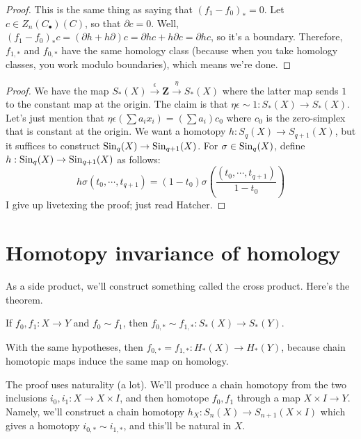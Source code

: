 		\begin{proof}
		This is the same thing as saying that $(f_1-f_0)_\ast=0$. Let $c\in Z_n(C_\bullet)(C)$, so that $\partial c=0$. Well, $(f_1-f_0)_\ast c=(\partial h+h\partial)c=\partial hc+h\partial c=\partial hc$, so it's a boundary. Therefore, $f_{1,\ast}$ and $f_{0,\ast}$ have the same homology class (because when you take homology classes, you work modulo boundaries), which means we're done.
		\end{proof}
		\begin{proof}
		We have the map $S_\ast(X)\xrightarrow{\epsilon}\mathbf{Z}\xrightarrow{\eta}S_\ast(X)$ where the latter map sends $1$ to the constant map at the origin. The claim is that $\eta\epsilon\sim 1:S_\ast(X)\to S_\ast(X)$. Let's just mention that $\eta\epsilon(\sum a_ix_i)=(\sum a_i)c_0$ where $c_0$ is the zero-simplex that is constant at the origin. We want a homotopy $h:S_q(X)\to S_{q+1}(X)$, but it suffices to construct $\mathrm{Sin}_q(X)\to \mathrm{Sin}_{q+1}(X)$. For $\sigma\in\mathrm{Sin}_q(X)$, define $h:\mathrm{Sin}_q(X)\to\mathrm{Sin}_{q+1}(X)$ as follows:
		$$h\sigma(t_0,\cdots,t_{q+1})=(1-t_0)\sigma\left(\frac{(t_0,\cdots,t_{q+1})}{1-t_0}\right)$$
		I give up livetexing the proof; just read Hatcher.
		\end{proof}
\section{Homotopy invariance of homology}
As a side product, we'll construct something called the cross product. Here's the theorem.
	\begin{theorem}
	If $f_0,f_1:X\to Y$ and $f_0\sim f_1$, then $f_{0,\ast}\sim f_{1,\ast}:S_\ast(X)\to S_\ast(Y)$.
	\end{theorem}
	\begin{corollary}
	With the same hypotheses, then $f_{0,\ast}=f_{1,\ast}: H_\ast(X)\to H_\ast(Y)$, because chain homotopic maps induce the same map on homology.
	\end{corollary}
The proof uses naturality (a lot). We'll produce a chain homotopy from the two inclusions $i_0,i_1:X\to X\times I$, and then homotope $f_0,f_1$ through a map $X\times I\to Y$. Namely, we'll construct a chain homotopy $h_X:S_n(X)\to S_{n+1}(X\times I)$ which gives a homotopy $i_{0,\ast}\sim i_{1,\ast}$, and this'll be natural in $X$.


